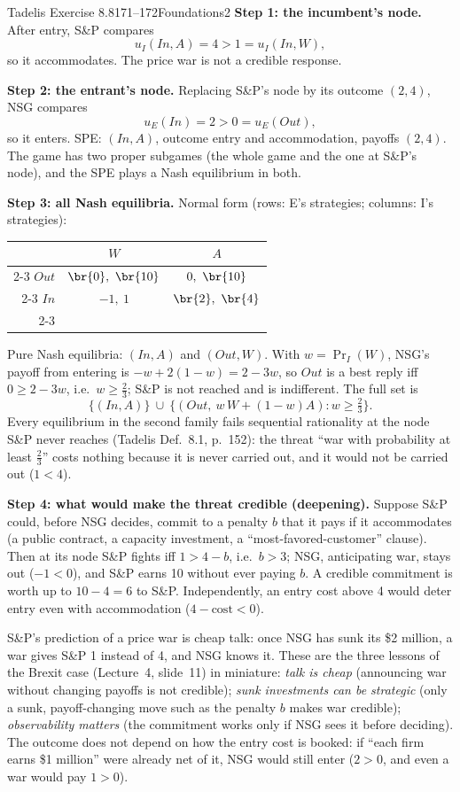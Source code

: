 \begin{exsol}{Tadelis Exercise 8.8}{171--172}{Foundations}{2}
\textbf{Step 1: the incumbent's node.} After entry, S\&P compares
\[
  u_I(\mathit{In},A) = 4 > 1 = u_I(\mathit{In},W),
\]
so it accommodates. The price war is not a credible response.

\textbf{Step 2: the entrant's node.} Replacing S\&P's node by its outcome $(2,4)$, NSG compares
\[
  u_E(\mathit{In}) = 2 > 0 = u_E(\mathit{Out}),
\]
so it enters. SPE: $(\mathit{In}, A)$, outcome entry and accommodation, payoffs $(2,4)$. The game
has two proper subgames (the whole game and the one at S\&P's node), and the SPE plays a Nash
equilibrium in both.

\textbf{Step 3: all Nash equilibria.} Normal form (rows: E's strategies; columns: I's strategies):
\begin{center}
\begin{tabular}{r|c|c|}
\multicolumn{1}{r}{} & \multicolumn{1}{c}{$W$} & \multicolumn{1}{c}{$A$}\\ \cline{2-3}
$\mathit{Out}$ & $\br{0},\ \br{10}$ & $0,\ \br{10}$ \\ \cline{2-3}
$\mathit{In}$ & $-1,\ 1$ & $\br{2},\ \br{4}$ \\ \cline{2-3}
\end{tabular}
\end{center}
Pure Nash equilibria: $(\mathit{In},A)$ and $(\mathit{Out},W)$. With $w = \Pr_I(W)$, NSG's
payoff from entering is $-w + 2(1-w) = 2 - 3w$, so $\mathit{Out}$ is a best reply iff
$0 \ge 2 - 3w$, i.e.\ $w \ge \frac23$; S\&P is not reached and is indifferent. The full set is
\[
  \{(\mathit{In}, A)\} \ \cup\ \{(\mathit{Out},\ w\,W + (1-w)A) : w \ge \tfrac23\}.
\]
Every equilibrium in the second family fails sequential rationality at the node S\&P never reaches
(Tadelis Def.~8.1, p.~152): the threat ``war with probability at least $\frac23$'' costs nothing
because it is never carried out, and it would not be carried out ($1 < 4$).

\textbf{Step 4: what would make the threat credible (deepening).} Suppose S\&P could, before NSG
decides, commit to a penalty $b$ that it pays if it accommodates (a public contract, a capacity
investment, a ``most-favored-customer'' clause). Then at its node S\&P fights iff $1 > 4 - b$,
i.e.\ $b > 3$; NSG, anticipating war, stays out ($-1 < 0$), and S\&P earns 10 without ever paying
$b$. A credible commitment is worth up to $10 - 4 = 6$ to S\&P. Independently, an entry cost above 4
would deter entry even with accommodation ($4 - \text{cost} < 0$).

\interp S\&P's prediction of a price war is cheap talk: once NSG has sunk its \$2 million, a war
gives S\&P 1 instead of 4, and NSG knows it. These are the three lessons of the Brexit case
(Lecture~4, slide~11) in miniature: \emph{talk is cheap} (announcing war without changing payoffs is
not credible); \emph{sunk investments can be strategic} (only a sunk, payoff-changing move such as
the penalty $b$ makes war credible); \emph{observability matters} (the commitment works only if NSG
sees it before deciding). The outcome does not depend on how the entry cost is booked: if ``each
firm earns \$1 million'' were already net of it, NSG would still enter ($2 > 0$, and even a war
would pay $1 > 0$).


\end{exsol}
